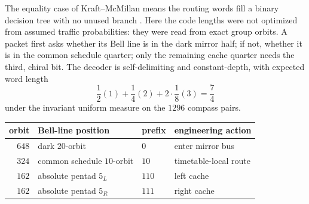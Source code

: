 \documentclass[11pt]{article}
\begin{document}
The equality case of Kraft--McMillan means the routing words fill a
binary decision tree with no unused branch \cite{mcmillan}.  Here the
code lengths were not optimized from assumed traffic probabilities:
they were read from exact group orbits.  A packet first asks whether
its Bell line is in the dark mirror half; if not, whether it is in the
common schedule quarter; only the remaining cache quarter needs the
third, chiral bit.  The decoder is self-delimiting and constant-depth,
with expected word length
\[
\frac12(1)+\frac14(2)+2\cdot\frac18(3)=\frac74
\]
under the invariant uniform measure on the $1296$ compass pairs.

\begin{center}\small
\begin{tabular}{rlll}
\toprule
orbit & Bell-line position & prefix & engineering action\\
\midrule
$648$ & dark $20$-orbit & $0$ & enter mirror bus\\
$324$ & common schedule $10$-orbit & $10$ & timetable-local route\\
$162$ & absolute pentad $5_L$ & $110$ & left cache\\
$162$ & absolute pentad $5_R$ & $111$ & right cache\\
\bottomrule
\end{tabular}
\end{center}
\end{document}
